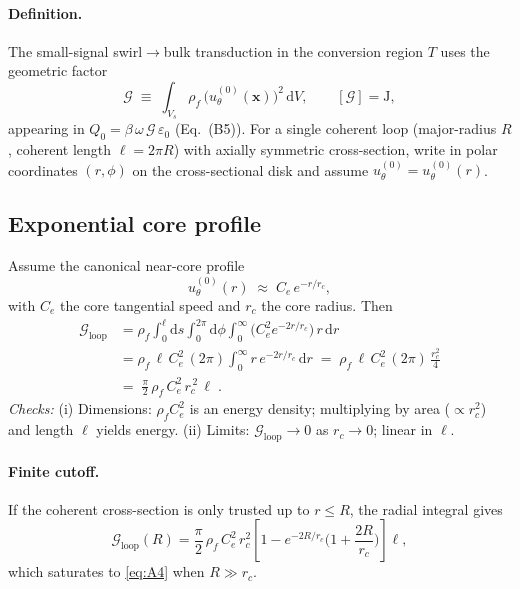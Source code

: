\documentclass[10pt,reprint,aps,onecolumn,nofootinbib]{revtex4-2}
\begin{document}
\paragraph{Definition.}
    The small-signal swirl$\to$bulk transduction in the conversion region $T$ uses the geometric factor
    \begin{equation}
        \mathcal{G}\;\equiv\;\int_{V_s}\rho_f\,\big(u_\theta^{(0)}(\mathbf{x})\big)^2\,\mathrm{d}V,
        \qquad [\mathcal{G}]=\mathrm{J},
        \label{eq:A1}
    \end{equation}
    appearing in $Q_0=\beta\,\omega\,\mathcal{G}\,\varepsilon_0$ (Eq.~\textup{(B5)}). For a single coherent loop (major-radius $R$, coherent length $\ell=2\pi R$) with axially symmetric cross-section, write in polar coordinates $(r,\phi)$ on the cross-sectional disk and assume $u_\theta^{(0)}=u_\theta^{(0)}(r)$.

\subsection*{Exponential core profile}
Assume the canonical near-core profile
\begin{equation}
    u_\theta^{(0)}(r)\;\approx\;C_e\,e^{-r/r_c},
    \label{eq:A2}
\end{equation}
with $C_e$ the core tangential speed and $r_c$ the core radius. Then
\begin{align}
    \mathcal{G}_{\text{loop}}
    &= \rho_f \int_0^\ell\!\mathrm{d}s\!\int_0^{2\pi}\!\mathrm{d}\phi\!\int_0^\infty\!\big(C_e^2 e^{-2r/r_c}\big)\,r\,\mathrm{d}r
    \label{eq:A3}\\[3pt]
    &= \rho_f\,\ell\,C_e^2\,(2\pi)\int_0^\infty r\,e^{-2r/r_c}\,\mathrm{d}r
    \;=\; \rho_f\,\ell\,C_e^2\,(2\pi)\,\frac{r_c^2}{4}\nonumber\\[2pt]
    &=\boxed{\;\frac{\pi}{2}\,\rho_f\,C_e^2\,r_c^{\,2}\,\ell\;}.
    \label{eq:A4}
\end{align}
\emph{Checks:} (i) Dimensions: $\rho_f C_e^2$ is an energy density; multiplying by area ($\propto r_c^2$) and length $\ell$ yields energy. (ii) Limits: $\mathcal{G}_{\text{loop}}\to 0$ as $r_c\to 0$; linear in $\ell$.

\paragraph{Finite cutoff.}
    If the coherent cross-section is only trusted up to $r\le R$, the radial integral gives
    \begin{equation}
        \mathcal{G}_{\text{loop}}(R)
        =\frac{\pi}{2}\,\rho_f\,C_e^2\,r_c^2\!\left[1-e^{-2R/r_c}\!\Big(1+\frac{2R}{r_c}\Big)\right]\ell,
        \label{eq:A5}
    \end{equation}
    which saturates to \eqref{eq:A4} when $R\!\gg\! r_c$.
\end{document}
